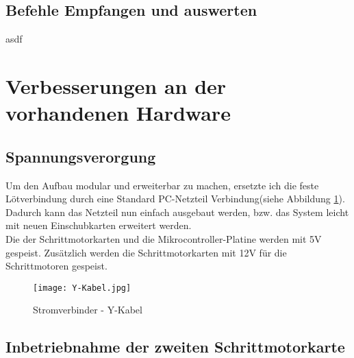 \subsection{Befehle Empfangen und auswerten}
asdf


\section{Verbesserungen an der vorhandenen Hardware}
\subsection{Spannungsverorgung}
Um den Aufbau modular und erweiterbar zu machen, ersetzte ich die feste Lötverbindung durch eine Standard PC-Netzteil Verbindung(siehe Abbildung \ref{fig:Y-Kabel}). Dadurch kann das Netzteil nun einfach ausgebaut werden, bzw. das System leicht mit neuen Einschubkarten erweitert werden.\\
Die  der Schrittmotorkarten und die Mikrocontroller-Platine werden mit 5V gespeist. Zusätzlich werden die Schrittmotorkarten mit 12V für die Schrittmotoren gespeist.
\begin{figure}[h]
\centering
\texttt{[image: Y-Kabel.jpg]}
\caption{Stromverbinder - Y-Kabel}
\label{fig:Y-Kabel}
\end{figure}

\subsection{Inbetriebnahme der zweiten Schrittmotorkarte}

